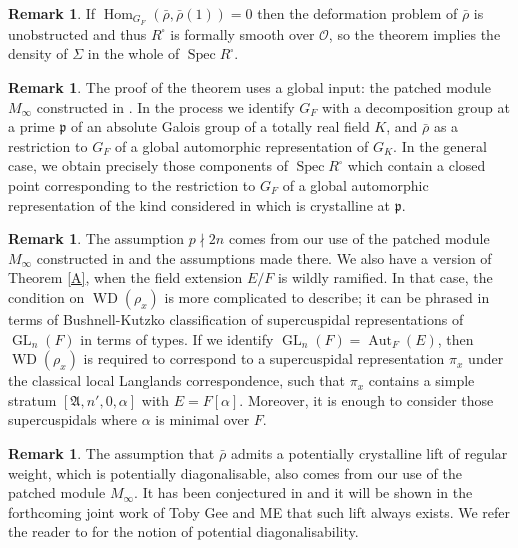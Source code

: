\documentclass[JEP,XML,SOM,Unicode,NoEqCountersInSection]{cedram}
\let\mathcal\mathscr
\newcommand{\ssquare}{{\scriptscriptstyle\square}}
\theoremstyle{definition}
\newtheorem{remark}[prop]{Remark}
\DeclareMathOperator{\Aut}{Aut}
\DeclareMathOperator{\Hom}{Hom}
\DeclareMathOperator{\GL}{GL}
\DeclareMathOperator{\WD}{WD}
\DeclareMathOperator{\Spec}{Spec}
\newcommand{\cO}{\mathcal{O}}
\newcommand{\pp}{\mathfrak p}
\newcommand{\rhobar}{\bar{\rho}}
\begin{document}
\begin{remark} If $\Hom_{G_F}(\rhobar, \rhobar(1))=0$ then the deformation problem of $\rhobar$ is unobstructed and thus $R^\ssquare$ is formally smooth over $\cO$, so the theorem
implies the density of $\Sigma$ in the whole of $\Spec R^\ssquare$.
\end{remark}

\begin{remark} The proof of the theorem uses a global input: the patched module $M_\infty$ constructed in
\cite{six-authors}. In the process we identify $G_F$ with a decomposition group at a prime $\pp$ of an absolute Galois group of a totally real field $K$, and $\rhobar$ as a restriction to $G_F$ of a global automorphic representation of $G_K$. In the general case, we obtain precisely those components of $\Spec R^\ssquare$ which contain a closed point corresponding to the restriction to $G_F$
of a global automorphic representation of the kind considered in \cite[\S 2.4]{six-authors} which is crystalline at $\pp$.
\end{remark}

\begin{remark} The assumption $p \nmid 2n$ comes from our use of the patched
module $M_{\infty}$ constructed in \cite{six-authors} and the assumptions made there. We also have a version of Theorem \ref{A}, when the field extension $E/F$ is wildly ramified. In that case, the condition on $\WD(\rho_x)$ is more complicated to describe; it can be phrased in terms of Bushnell-Kutzko classification of supercuspidal representations of
$\GL_n(F)$ in terms of types. If we identify $\GL_n(F)=\Aut_F(E)$, then $\WD(\rho_x)$ is required to correspond to a supercuspidal representation $\pi_x$ under the classical local
Langlands correspondence, such that $\pi_x$ contains a simple stratum $[\mathfrak A, n', 0, \alpha]$ with $E=F[\alpha]$. Moreover, it is enough to consider those supercuspidals where $\alpha$ is minimal over $F$.
\end{remark}

\begin{remark}\label{vac} The assumption that $\rhobar$ admits a potentially crystalline lift of regular weight, which is
potentially diagonalisable, also comes from our use of the patched module $M_{\infty}$. It has been conjectured in \cite{BMcycles} and it will be shown in the forthcoming joint work of Toby Gee and ME that such lift always exists. We refer the reader to \cite[\S 1.4]{BLGGT} for the notion of potential diagonalisability.
\end{remark}
\end{document}

